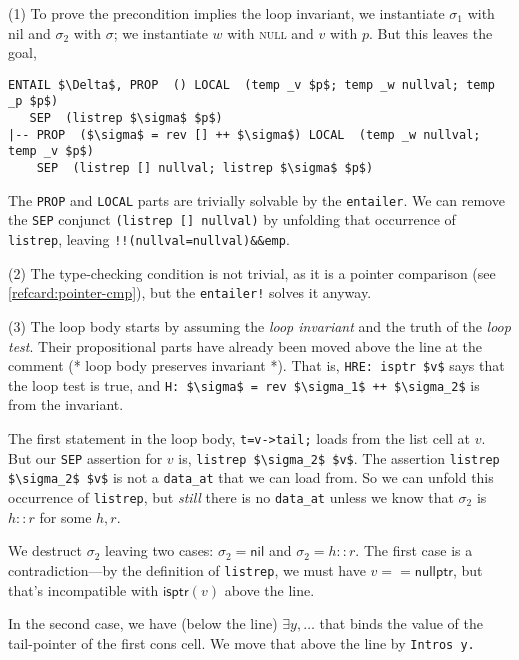 \documentclass[12pt,fleqn,openany,oneside,showtrims]{memoir}
\begin{document}
(1) To prove the precondition implies the loop invariant,
we instantiate $\sigma_1$ with nil
and $\sigma_2$ with $\sigma$;
we instantiate $w$ with \textsc{null} and $v$ with $p$.
But this leaves the goal,
\begin{lstlisting}
ENTAIL $\Delta$, PROP  () LOCAL  (temp _v $p$; temp _w nullval; temp _p $p$)
   SEP  (listrep $\sigma$ $p$)
|-- PROP  ($\sigma$ = rev [] ++ $\sigma$) LOCAL  (temp _w nullval; temp _v $p$)
    SEP  (listrep [] nullval; listrep $\sigma$ $p$)
\end{lstlisting}
\vspace{-3ex}
The \lstinline{PROP} and \lstinline{LOCAL} parts are trivially
solvable by the \lstinline{entailer}.
We can remove the \lstinline{SEP} conjunct
\lstinline{(listrep [] nullval)}
by unfolding that occurrence of \lstinline{listrep},
leaving \lstinline{!!(nullval=nullval)&&emp}.

\vspace{-2ex}
(2) The type-checking condition is not trivial, as it is a pointer
comparison (see \autoref{refcard:pointer-cmp}), but
the \lstinline{entailer!} solves it anyway.

(3) The loop body starts by assuming the \emph{loop invariant}
and the truth of the \emph{loop test}.  Their propositional parts have already
been moved above the line at the comment
\textsf{(* loop body preserves invariant *)}.
That is, \lstinline{HRE: isptr $v$} says that the loop test is true,
and \lstinline{H: $\sigma$ = rev $\sigma_1$ ++ $\sigma_2$} is from the invariant.

The first statement in the loop body, \lstinline{t=v->tail;}
loads from the list cell at $v$.  But our \lstinline{SEP}
assertion for $v$ is,
\lstinline{listrep $\sigma_2$ $v$}.
The assertion
\lstinline{listrep $\sigma_2$ $v$}
is not a \lstinline{data_at} that we can load from.
So we can unfold this occurrence of \lstinline{listrep},
but \emph{still} there is no \lstinline{data_at}
unless we know that $\sigma_2$ is $h::r$ for some $h,r$.

We destruct $\sigma_2$ leaving two cases:
$\sigma_2=\mathsf{nil}$ and
$\sigma_2=h::r$.  The first case is a contradiction---by the
definition of \lstinline{listrep}, we must have $v==\mathsf{nullptr}$,
but that's incompatible with $\mathsf{isptr}(v)$ above the line.

In the second case, we have (below the line)
$\exists y, \ldots$ that binds the value of the
tail-pointer of the first cons cell.  We move that above
the line by \lstinline{Intros y.}
\end{document}
